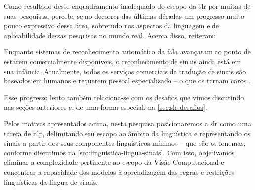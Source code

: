 Como resultado desse enquadramento inadequado do escopo da \acrshort{slr} por muitas de suas pesquisas, percebe-se no decorrer das últimas décadas um progresso muito pouco expressivo dessa área, sobretudo nos aspectos da linguagem e de aplicabilidade dessas pesquisas no mundo real. Acerca disso,  reiteram:

\begin{citacao}
    Enquanto sistemas de reconhecimento automático da fala avançaram ao ponto de estarem comercialmente disponíveis, o reconhecimento de sinais ainda está em sua infância. Atualmente, todos os serviços comerciais de tradução de sinais são baseados em humanos e requerem pessoal especializado – o que os tornam caros \cite[tradução nossa]{cooper-2011-slr}.
\end{citacao}

Esse progresso lento também relaciona-se com os desafios que vimos discutindo nas seções anteriores e, de uma forma especial, na \autoref{sec:slr-desafios}.



Pelos motivos apresentados acima, nesta pesquisa posicionaremos a \acrshort{slr} como uma tarefa de \acrshort{nlp}, delimitando seu escopo ao âmbito da linguística e representando os sinais a partir dos seus componentes linguísticos mínimos -- que são os fonemas, conforme discutimos na \autoref{sec:linguistica-lingua-sinais}.
Com isso, objetivamos eliminar a complexidade pertinente ao escopo da Visão Computacional e concentrar a capacidade dos modelos à aprendizagem das regras e restrições linguísticas da língua de sinais.

